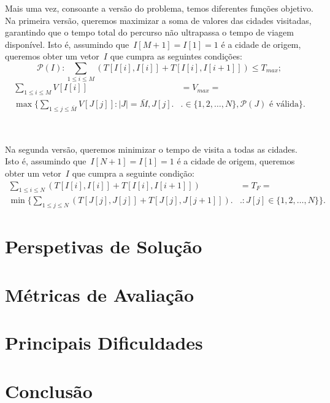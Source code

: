 \documentclass[12pt,a4paper,reqno]{report}
\numberwithin{figure}{section}
\numberwithin{equation}{section}
\begin{document}
Mais uma vez, consoante a versão do problema, temos diferentes funções objetivo. Na primeira versão, queremos maximizar a soma de valores das cidades visitadas, garantindo que o tempo total do percurso não ultrapassa o tempo de viagem disponível. Isto é, assumindo que~$I[M+1] = I[1] = 1$ é a cidade de origem, queremos obter um vetor~$I$ que cumpra as seguintes condições:
\begin{equation}
		\mathscr{P}(I): \sum_{1 \leq i \leq M} (T[I[i],I[i]] + T[I[i],I[i+1]]) \leq T_{max};
\end{equation}
\begin{equation}
	\begin{split}
		\sum_{1 \leq i \leq M} V[I[i]] & = V_{max} = \\
		\max \Bigg\{\sum_{1 \leq j \leq \bar{M}} V[J[j]] : |J| = \bar{M}, J[j] \Bigg. & \Bigg. \in \{1, 2, \ldots, N\}, \mathscr{P}(J) \text{ é válida}\Bigg\}.
	\end{split}
\end{equation}

\
\
\

Na segunda versão, queremos minimizar o tempo de visita a todas as cidades. Isto é, assumindo que~$I[N+1] = I[1] = 1$ é a cidade de origem, queremos obter um vetor~$I$ que cumpra a seguinte condição:
\begin{equation}
	\begin{align*}
		\sum_{1 \leq i \leq N} (T[I[i],I[i]] + T[I[i],I[i+1]]) & = T_F = \\
		\min \Bigg\{\sum_{1 \leq j \leq N} (T[J[j],J[j]] + T[J[j],J[j+1]]) \Bigg. & \Bigg. : J[j] \in \{1, 2, \ldots, N\}\Bigg\}.
	\end{align*}
\end{equation}

\chapter{Perspetivas de Solução}

\chapter{Métricas de Avaliação}

\chapter{Principais Dificuldades}



\chapter{Conclusão}
\end{document}
